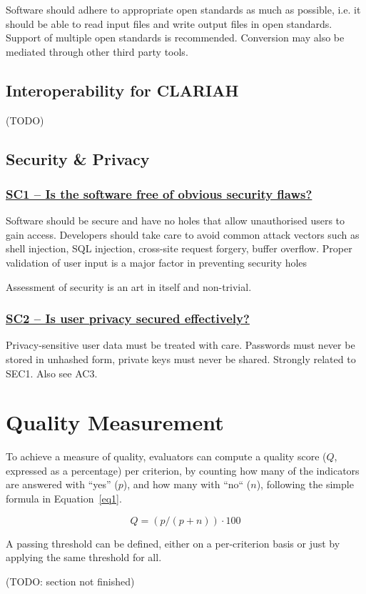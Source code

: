 \documentclass[a4paper,11pt]{article}
\newcommand{\indicator}[1]{\subsubsection*{\underline{#1}}}
\begin{document}
Software should adhere to appropriate open standards as much as possible, i.e.
it should be able to read input files and write output files in open
standards. Support of multiple open standards is recommended. Conversion may
also be mediated through other third party tools.

\subsection{Interoperability for CLARIAH}

(TODO)

\subsection{Security \& Privacy}

\indicator{SC1 -- Is the software free of obvious security flaws?}

Software should be secure and have no holes that allow unauthorised users to
gain access. Developers should take care to avoid common attack vectors such as
shell injection, SQL injection, cross-site request forgery, buffer overflow.
Proper validation of user input is a major factor in preventing security holes

Assessment of security is an art in itself and non-trivial. 

\indicator{SC2 -- Is user privacy secured effectively?}

Privacy-sensitive user data must be treated with care. Passwords must never be
stored in unhashed form, private keys must never be shared. Strongly related to
SEC1. Also see AC3.


\section{Quality Measurement}

To achieve a measure of quality, evaluators can compute a quality score ($Q$,
expressed as a percentage) per criterion, by counting how many of the
indicators are answered with ``yes'' ($p$), and how many with ``no`` ($n$),
following the simple formula in Equation~\ref{eq1}.

\begin{equation}
\label{eq1}
Q = (p / (p + n)) \cdot 100
\end{equation}

A passing threshold can be defined, either on a per-criterion basis or just
by applying the same threshold for all. 

(TODO: section not finished)




\end{document}
